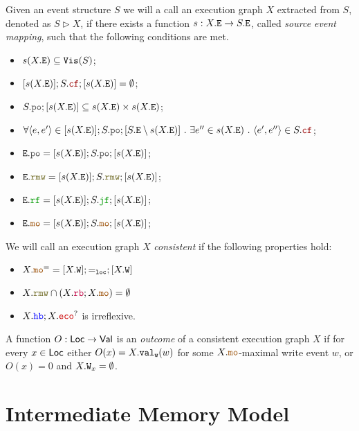 \documentclass[12pt]{article}
\begin{document}
\begin{definition}
  Given an event structure $S$ we will a call an execution graph $X$
  extracted from $S$, denoted as $S \rhd X$,
  if there exists a function $s : X.{\mathtt{E}} \rightarrow S.{\mathtt{E}}$, called \emph{source event mapping},
  such that the following conditions are met.
  \begin{itemize}
    \item $s(X.{\mathtt{E}}) \subseteq {\mathtt{Vis}}(S)$;
    \item $[s(X.\lE)];S.\lCF;[s(X.\lE)] = \emptyset$;
    \item $S.\lPO;[s(X.\lE)] \subseteq s(X.\lE) \times s(X.\lE)$;
    \item $\forall{\tup{e, e'}} \in [s(X.\lE)];S.\lPO;[S.\lE \setminus s(X.\lE)] ~.~ 
      \exists{e''} \in s(X.\lE) ~.~ \tup{e', e''} \in S.\lCF$;
    \item $\lE.\lPO = [s(X.\lE)];S.\lPO;[s(X.\lE)]$;
    \item $\lE.\lRMW = [s(X.\lE)];S.\lRMW;[s(X.\lE)]$;
    \item $\lE.\lRF = [s(X.\lE)];S.\lJF;[s(X.\lE)]$;
    \item $\lE.\lMO = [s(X.\lE)];S.\lMO;[s(X.\lE)]$;
  \end{itemize}
\end{definition}

\begin{definition}
  We will call an execution graph $X$ \emph{consistent} if the following properties hold:
  \begin{itemize}
    \item $X.\lMO^= = [X.\lW];=_{\lLOC};[X.\lW]$
    \item $X.\lRMW \cap (X.\lRB;X.\lMO) = \emptyset$
    \item $X.\lHB;X.\lECO^?$ is irreflexive.
  \end{itemize}
\end{definition}

\begin{definition}
  A function $O : \mathsf{Loc} \rightarrow \mathsf{Val}$ is an \emph{outcome} 
  of a consistent execution graph $X$
  if for every $x \in \mathsf{Loc}$ either $O(x) = X.{\mathtt{val_w}}(w)$ 
  for some $X.\lMO$-maximal write event $w$, 
  or $O(x) = 0$ and $X.{\mathtt{W}}_x = \emptyset$.
\end{definition}

\section{Intermediate Memory Model}
\end{document}
